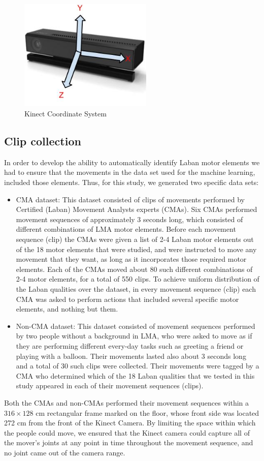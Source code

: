 \begin{figure}[h] \centering
\includegraphics[width=2.5in]{graphics/Laban/KinectV2CoordinateSystem.jpg}
\caption{Kinect Coordinate System}
\label{Coordinate}
\end{figure}

\subsection{Clip collection}
In order to develop the ability to automatically identify Laban motor elements
we had to ensure that the movements in the data set used for the machine
learning, included those elements. Thus, for this study, we generated two
specific data sets:
\begin{itemize}
  \item CMA dataset: This dataset consisted of clips of movements performed by
  Certified (Laban) Movement Analysts experts (CMAs). Six CMAs performed
  movement sequences of approximately 3 seconds long, which consisted of different 
  combinations of LMA motor elements. Before each movement sequence (clip) the
  CMAs were given a list of 2-4 Laban motor elements out of the 18 motor elements that 
  were studied, and were instructed to move any movement that they want, as long 
  as it incorporates those required motor elements. Each of the CMAs moved about 
  80 such different combinations of 2-4 motor elements, for a total of 550 clips. 
  To achieve uniform distribution of the Laban qualities over the dataset, in every 
  movement sequence (clip) each CMA was asked to perform actions that included
  several specific motor elements, and nothing but them.
  \item Non-CMA dataset: This dataset consisted of movement sequences performed
  by two people without a background in LMA, who were asked to move as if they are 
  performing different every-day tasks such as greeting a friend or playing with 
  a balloon. Their movements lasted also about 3 seconds long and a total of 30
  such clips were collected. Their movements were tagged by a CMA who determined 
  which of the 18 Laban qualities that we tested in this study appeared in each of 
  their movement sequences (clips).
\end{itemize}
\par Both the CMAs and non-CMAs performed their movement sequences within a
$316\times 128$ cm rectangular frame marked on the floor, whose front side was
located 272 cm from the front of the Kinect Camera. By limiting the space within which the people could move, we ensured that the Kinect camera could capture all of the mover's joints 
at any point in time throughout the movement sequence, and no joint came out of the 
camera range.
